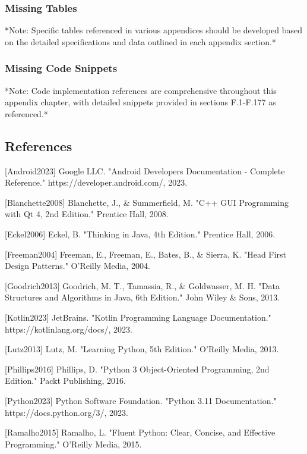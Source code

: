 \documentclass[12pt,a4paper]{article}
\begin{document}
{{\begin{itemize}
\end{itemize}
\subsubsection{Missing Tables}

*Note: Specific tables referenced in various appendices should be developed based on the detailed specifications and
data outlined in each appendix section.*

\subsubsection{Missing Code Snippets}

*Note: Code implementation references are comprehensive throughout this appendix chapter, with detailed snippets
provided in sections F.1-F.177 as referenced.*

\subsection{References}

[Android2023] Google LLC. "Android Developers Documentation - Complete Reference." https://developer.android.com/, 2023.

[Blanchette2008] Blanchette, J., \& Summerfield, M. "C++ GUI Programming with Qt 4, 2nd Edition." Prentice Hall, 2008.

[Eckel2006] Eckel, B. "Thinking in Java, 4th Edition." Prentice Hall, 2006.

[Freeman2004] Freeman, E., Freeman, E., Bates, B., \& Sierra, K. "Head First Design Patterns." O'Reilly Media, 2004.

[Goodrich2013] Goodrich, M. T., Tamassia, R., \& Goldwasser, M. H. "Data Structures and Algorithms in Java, 6th Edition."
John Wiley \& Sons, 2013.

[Kotlin2023] JetBrains. "Kotlin Programming Language Documentation." https://kotlinlang.org/docs/, 2023.

[Lutz2013] Lutz, M. "Learning Python, 5th Edition." O'Reilly Media, 2013.

[Phillips2016] Phillips, D. "Python 3 Object-Oriented Programming, 2nd Edition." Packt Publishing, 2016.

[Python2023] Python Software Foundation. "Python 3.11 Documentation." https://docs.python.org/3/, 2023.

[Ramalho2015] Ramalho, L. "Fluent Python: Clear, Concise, and Effective Programming." O'Reilly Media, 2015.

}}
\end{document}
